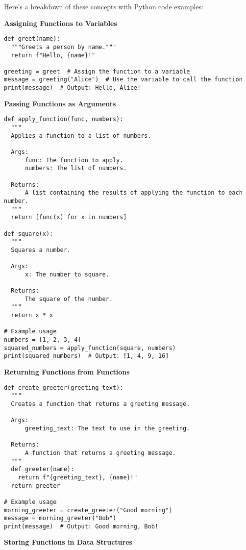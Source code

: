 Here's a breakdown of these concepts with Python code examples:

\textbf{Assigning Functions to Variables}

\begin{lstlisting}[style=mystyle]
def greet(name):
  """Greets a person by name."""
  return f"Hello, {name}!"

greeting = greet  # Assign the function to a variable
message = greeting("Alice")  # Use the variable to call the function
print(message)  # Output: Hello, Alice!
\end{lstlisting}

\textbf{Passing Functions as Arguments}

\begin{lstlisting}[style=mystyle]
def apply_function(func, numbers):
  """
  Applies a function to a list of numbers.

  Args:
      func: The function to apply.
      numbers: The list of numbers.

  Returns:
      A list containing the results of applying the function to each number.
  """
  return [func(x) for x in numbers]

def square(x):
  """
  Squares a number.

  Args:
      x: The number to square.

  Returns:
      The square of the number.
  """
  return x * x

# Example usage
numbers = [1, 2, 3, 4]
squared_numbers = apply_function(square, numbers)
print(squared_numbers)  # Output: [1, 4, 9, 16]
\end{lstlisting}

\textbf{Returning Functions from Functions}

\begin{lstlisting}[style=mystyle]
def create_greeter(greeting_text):
  """
  Creates a function that returns a greeting message.

  Args:
      greeting_text: The text to use in the greeting.

  Returns:
      A function that returns a greeting message.
  """
  def greeter(name):
    return f"{greeting_text}, {name}!"
  return greeter

# Example usage
morning_greeter = create_greeter("Good morning")
message = morning_greeter("Bob")
print(message)  # Output: Good morning, Bob!
\end{lstlisting}

\textbf{Storing Functions in Data Structures}

